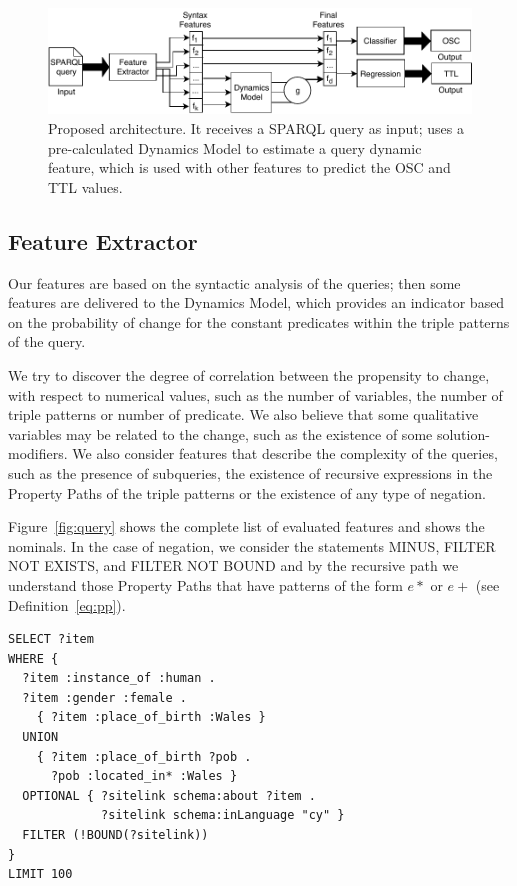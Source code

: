 \documentclass[runningheads]{llncs}
\begin{document}
\begin{figure}[!ht]
	\centering
	\includegraphics[width=0.7\linewidth]{img/schema.pdf}
	\caption{ Proposed architecture. It receives a SPARQL query as input; uses a pre-calculated Dynamics Model to estimate a query dynamic feature, which is used with other features to predict the OSC and TTL values. }
	\label{fig:schema}
\end{figure}

\subsection{Feature Extractor}

Our features are based on the syntactic analysis of the queries; then some features are delivered to the Dynamics Model, which provides an indicator based on the probability of change for the constant predicates within the triple patterns of the query.

We try to discover the degree of correlation between the propensity to change, with respect to numerical values, such as the number of variables, the number of triple patterns or number of predicate. We also believe that some qualitative variables may be related to the change, such as the existence of some solution-modifiers. We also consider features that describe the complexity of the queries, such as the presence of subqueries, the existence of recursive expressions in the Property Paths of the triple patterns or the existence of any type of negation.

Figure~\ref{fig:query} shows the complete list of evaluated features and shows the nominals. In the case of negation, we consider the statements MINUS, FILTER NOT EXISTS, and FILTER NOT BOUND and by the recursive path we understand those Property Paths that have patterns of the form $e*$ or $e+$ (see Definition~\ref{eq:pp}).

\begin{lstlisting}[captionpos=b, caption=Query example, label=fig:query,
basicstyle=\ttfamily,frame=single]
SELECT ?item
WHERE {
  ?item :instance_of :human .
  ?item :gender :female .
    { ?item :place_of_birth :Wales }
  UNION
    { ?item :place_of_birth ?pob .
      ?pob :located_in* :Wales }
  OPTIONAL { ?sitelink schema:about ?item .
             ?sitelink schema:inLanguage "cy" }
  FILTER (!BOUND(?sitelink))
}
LIMIT 100
\end{lstlisting}
\end{document}
